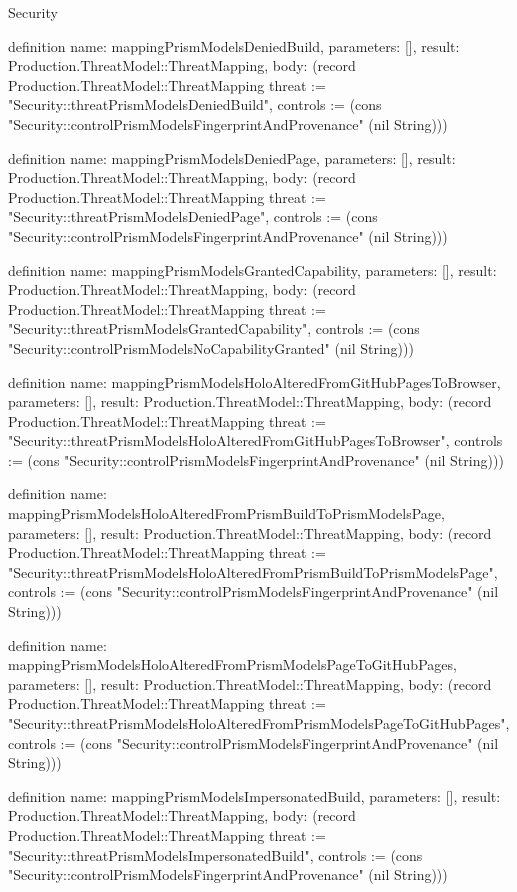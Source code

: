 \begin{lexlean}{Security}
\begin{semanticmodule}
definition{
  name: mappingPrismModelsDeniedBuild,
  parameters: [],
  result: Production.ThreatModel::ThreatMapping,
  body: (record Production.ThreatModel::ThreatMapping {threat := "Security::threatPrismModelsDeniedBuild", controls := (cons "Security::controlPrismModelsFingerprintAndProvenance" (nil String))})
}

definition{
  name: mappingPrismModelsDeniedPage,
  parameters: [],
  result: Production.ThreatModel::ThreatMapping,
  body: (record Production.ThreatModel::ThreatMapping {threat := "Security::threatPrismModelsDeniedPage", controls := (cons "Security::controlPrismModelsFingerprintAndProvenance" (nil String))})
}

definition{
  name: mappingPrismModelsGrantedCapability,
  parameters: [],
  result: Production.ThreatModel::ThreatMapping,
  body: (record Production.ThreatModel::ThreatMapping {threat := "Security::threatPrismModelsGrantedCapability", controls := (cons "Security::controlPrismModelsNoCapabilityGranted" (nil String))})
}

definition{
  name: mappingPrismModelsHoloAlteredFromGitHubPagesToBrowser,
  parameters: [],
  result: Production.ThreatModel::ThreatMapping,
  body: (record Production.ThreatModel::ThreatMapping {threat := "Security::threatPrismModelsHoloAlteredFromGitHubPagesToBrowser", controls := (cons "Security::controlPrismModelsFingerprintAndProvenance" (nil String))})
}

definition{
  name: mappingPrismModelsHoloAlteredFromPrismBuildToPrismModelsPage,
  parameters: [],
  result: Production.ThreatModel::ThreatMapping,
  body: (record Production.ThreatModel::ThreatMapping {threat := "Security::threatPrismModelsHoloAlteredFromPrismBuildToPrismModelsPage", controls := (cons "Security::controlPrismModelsFingerprintAndProvenance" (nil String))})
}

definition{
  name: mappingPrismModelsHoloAlteredFromPrismModelsPageToGitHubPages,
  parameters: [],
  result: Production.ThreatModel::ThreatMapping,
  body: (record Production.ThreatModel::ThreatMapping {threat := "Security::threatPrismModelsHoloAlteredFromPrismModelsPageToGitHubPages", controls := (cons "Security::controlPrismModelsFingerprintAndProvenance" (nil String))})
}

definition{
  name: mappingPrismModelsImpersonatedBuild,
  parameters: [],
  result: Production.ThreatModel::ThreatMapping,
  body: (record Production.ThreatModel::ThreatMapping {threat := "Security::threatPrismModelsImpersonatedBuild", controls := (cons "Security::controlPrismModelsFingerprintAndProvenance" (nil String))})
}


\end{semanticmodule}
\end{lexlean}
